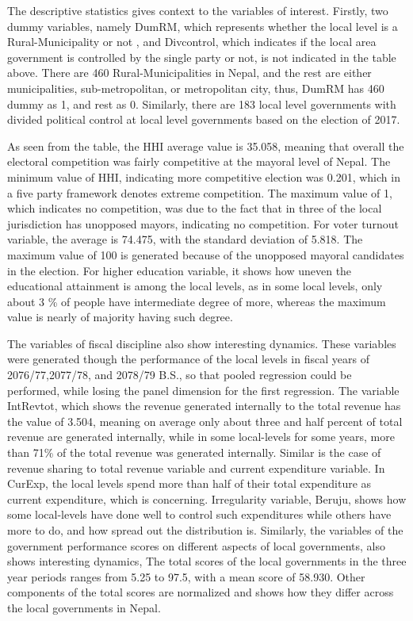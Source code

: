 The descriptive statistics gives context to the variables of interest. Firstly, two dummy variables, namely DumRM, which represents whether the local level is a Rural-Municipality or not , and Divcontrol, which indicates if the local area government is controlled by the single party or not, is not indicated in the table above. There are 460 Rural-Municipalities in Nepal, and the rest are either municipalities, sub-metropolitan, or metropolitan city, thus, DumRM has 460 dummy as 1, and rest as 0. Similarly, there are 183 local level governments with divided political control at local level governments based on the election of 2017. \par
As seen from the table, the HHI average value is 35.058, meaning that overall the electoral competition was fairly competitive at the mayoral level of Nepal. The minimum value of HHI, indicating more competitive election was 0.201, which in a five party framework denotes extreme competition. The maximum value of 1, which indicates no competition, was due to the fact that in three of the local jurisdiction has unopposed mayors, indicating no competition. For voter turnout variable, the average is 74.475, with the standard deviation of 5.818. The maximum value of 100 is generated because of the unopposed mayoral candidates in the election. For higher education variable, it shows how uneven the educational attainment is among the local levels, as in some local levels, only about 3 \% of people have intermediate degree of more, whereas the maximum value is nearly of majority having such degree.\par
The variables of fiscal discipline also show interesting dynamics. These variables were generated though the performance of the local levels in fiscal years of 2076/77,2077/78, and 2078/79 B.S., so that pooled regression could be performed, while losing the panel dimension for the first regression. The variable IntRevtot, which shows the revenue generated internally to the total revenue has the value of 3.504, meaning on average only about three and half percent of total revenue are generated internally, while in some local-levels for some years, more than 71\% of the total revenue was generated internally. Similar is the case of revenue sharing to total revenue variable and current expenditure variable. In CurExp, the local levels spend more than half of their total expenditure as current expenditure, which is concerning. Irregularity variable, Beruju, shows how some local-levels have done well to control such expenditures while others have more to do, and how spread out the distribution is.
Similarly, the variables of the government performance scores on different aspects of local governments, also shows interesting dynamics, The total scores of the local governments in the three year periods ranges from 5.25 to 97.5, with a mean score of 58.930. Other components of the total scores are normalized and shows how they differ across the local governments in Nepal.
